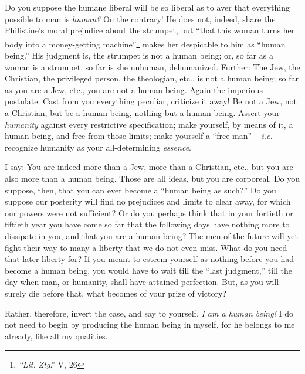 \documentclass[12pt,a4paper]{book}
\begin{document}
Do you suppose the humane liberal will be so liberal as to aver that 
everything possible to man is \textit{human?} On the contrary! He does not, 
indeed, share the Philistine's moral prejudice about the strumpet, but ``that 
this woman turns her body into a money-getting 
machine''\footnote{\textit{``Lit. Ztg}.'' V, 26} makes her despicable to 
him as ``human being.'' His judgment is, the strumpet is not a human being; 
or, so far as a woman is a strumpet, so far is she unhuman, dehumanized. 
Further: The Jew, the Christian, the privileged person, the theologian, etc., 
is not a human being; so far as you are a Jew, etc., you are not a human 
being. Again the imperious postulate: Cast from you everything peculiar, 
criticize it away! Be not a Jew, not a Christian, but be a human being, 
nothing but a human being. Assert your \textit{humanity} against every 
restrictive specification; make yourself, by means of it, a human being, and 
free from those limits; make yourself a ``free man'' -- \textit{i.e.} 
recognize humanity as your all-determining \textit{essence}.

I say: You are indeed more than a Jew, more than a Christian, etc., but you 
are also more than a human being. Those are all ideas, but you are corporeal. 
Do you suppose, then, that you can ever become a ``human being as such?'' Do 
you suppose our posterity will find no prejudices and limits to clear away, 
for which our powers were not sufficient? Or do you perhaps think that in your 
fortieth or fiftieth year you have come so far that the following days have 
nothing more to dissipate in you, and that you are a human being? The men of 
the future will yet fight their way to many a liberty that we do not even 
miss. What do you need that later liberty for? If you meant to esteem yourself 
as nothing before you had become a human being, you would have to wait till 
the ``last judgment,'' till the day when man, or humanity, shall have 
attained perfection. But, as you will surely die before that, what becomes of 
your prize of victory?

Rather, therefore, invert the case, and say to yourself, \textit{I am a human 
being!} I do not need to begin by producing the human being in myself, for he 
belongs to me already, like all my qualities.
\end{document}
